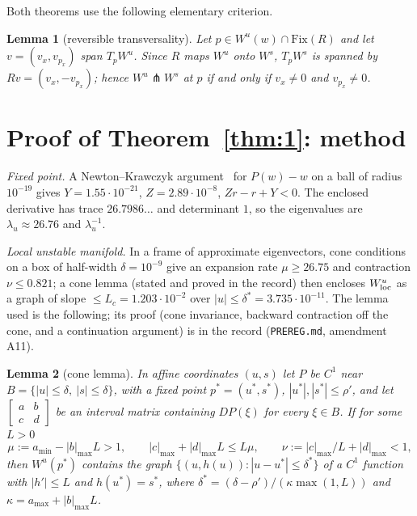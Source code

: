 \documentclass[11pt]{amsart}
\newtheorem{lemma}{Lemma}
\theoremstyle{remark}\newtheorem*{remark}{Remark}
\begin{document}
Both theorems use the following elementary criterion.
\begin{lemma}[reversible transversality]\label{lem:A1}
Let $p\in W^u(w)\cap\mathrm{Fix}(R)$ and let $v=(v_x,v_{p_x})$ span $T_pW^u$. Since $R$ maps $W^u$ onto $W^s$,
$T_pW^s$ is spanned by $Rv=(v_x,-v_{p_x})$; hence $W^u\pitchfork W^s$ at $p$ if and only if $v_x\neq0$ and $v_{p_x}\neq0$.
\end{lemma}

\section{Proof of Theorem~\ref{thm:1}: method}
\emph{Fixed point.} A Newton--Krawczyk argument~\cite[Thm.~30]{CKMJ} for $P(w)-w$ on a ball of radius $10^{-19}$ gives
$Y=1.55\cdot10^{-21}$, $Z=2.89\cdot10^{-8}$, $Zr-r+Y<0$. The enclosed derivative has trace $26.7986\ldots$ and
determinant $1$, so the eigenvalues are $\lambda_u\approx26.76$ and $\lambda_u^{-1}$.

\emph{Local unstable manifold.} In a frame of approximate eigenvectors, cone conditions on a box of half-width
$\delta=10^{-9}$ give an expansion rate $\mu\ge26.75$ and contraction $\nu\le0.821$; a cone lemma (stated and proved in
the record) then encloses $W^u_{\rm loc}$ as a graph of slope $\le L_c=1.203\cdot10^{-2}$ over $|u|\le\delta^*=3.735\cdot10^{-11}$.
The lemma used is the following; its proof (cone invariance, backward contraction off the cone, and a
continuation argument) is in the record (\texttt{PREREG.md}, amendment A11).

\begin{lemma}[cone lemma]\label{lem:cone}
In affine coordinates $(u,s)$ let $P$ be $C^1$ near $B=\{|u|\le\delta,\ |s|\le\delta\}$, with a fixed point
$p^*=(u^*,s^*)$, $|u^*|,|s^*|\le\rho'$, and let $\left[\begin{smallmatrix}a&b\\c&d\end{smallmatrix}\right]$ be an interval
matrix containing $DP(\xi)$ for every $\xi\in B$. If for some $L>0$
\[ \mu:=a_{\min}-|b|_{\max}L>1,\qquad |c|_{\max}+|d|_{\max}L\le L\mu,\qquad \nu:=|c|_{\max}/L+|d|_{\max}<1, \]
then $W^u(p^*)$ contains the graph $\{(u,h(u)):|u-u^*|\le\delta^*\}$ of a $C^1$ function with $|h'|\le L$ and
$h(u^*)=s^*$, where $\delta^*=(\delta-\rho')/(\kappa\max(1,L))$ and $\kappa=a_{\max}+|b|_{\max}L$.
\end{lemma}
\end{document}

